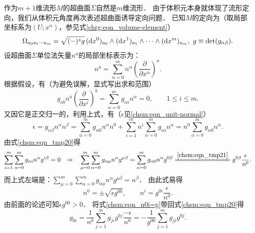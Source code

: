 作为$m+1$维流形$M$的超曲面$\Sigma$自然是$m$维流形．
由于体积元本身就体现了流形定向，我们从体积元角度再次表述超曲面诱导定向问题．
已知$M$的定向为（取局部坐标系为$(U;x^\alpha)$，参见式\eqref{chrg:eqn_volume-element}）
\begin{equation}\label{chsm:eqn_VEM}
    \Omega_{a_0 a_1 \cdots a_m}= \sqrt{(-)^s g}\, ({\rm d}x^0)_{a_0} \wedge({\rm d}x^1)_{a_1} \wedge
    \cdots \wedge({\rm d}x^m)_{a_m}, \  g\equiv \det(g_{\alpha\beta}).
\end{equation}
设超曲面$\Sigma$单位法矢量$n^a$的局部坐标表示为：
\begin{equation}
    n^a = \sum_{\alpha=0}^{m} n^\alpha \left(\frac{\partial }{\partial x^\alpha}\right)^a.
\end{equation}
根据假设，有（为避免误解，显式写出求和范围）
\begin{equation}\label{chsm:eqn_tmp20}
    g_{ab}n^a \left(\frac{\partial }{\partial x^i}\right)^b =
      \sum_{\alpha=0}^{m} g_{\alpha i}  n^\alpha =0, \qquad 1 \leqslant i \leqslant m.
\end{equation}
又因它是正交归一的，利用上式，有（$\epsilon$见\eqref{chsm:eqn_unit-normal}）
\begin{equation}\label{chsm:eqn_tmp21}
    \epsilon  = g_{\alpha\beta} n^\alpha n^\beta  %
     = \sum_{\alpha=0}^{m}g_{\alpha 0}n^\alpha n^0 + \sum_{i=1}^{m}  n^i \sum_{\alpha=0}^{m}g_{\alpha i}n^\alpha
     = n^0 \sum_{\alpha=0}^{m}g_{\alpha 0}n^\alpha  .
\end{equation}
由式\eqref{chsm:eqn_tmp20}得
\begin{equation*}
    \sum_{i=1}^{m}\sum_{\alpha=0}^{m} g_{\alpha i}  n^\alpha g^{i\beta} =0 {\quad \Rightarrow\quad }
    \sum_{\mu=0}^{m}\sum_{\alpha=0}^{m} g_{\alpha \mu}  n^\alpha g^{\mu\beta}
    =\sum_{\alpha=0}^{m} g_{\alpha 0}  n^\alpha g^{0\beta}
    \xlongequal{\ref{chsm:eqn_tmp21}}
    g^{0\beta} \frac{\epsilon}{n^0} .
\end{equation*}
而上式左端是：$\sum_{\mu=0}^{m}\sum_{\alpha=0}^{m} g_{\alpha \mu}  n^\alpha g^{\mu\beta} =n^\beta$．
由此式易得
\begin{equation}\label{chsm:eqn_n0i=g}
    n^0 = \pm \sqrt{\epsilon g^{00}}, \qquad
    n^i =  g^{0i} \frac{\epsilon}{n^0} .
\end{equation}
由前面的论述可知$\epsilon g^{00}>0$．
将式\eqref{chsm:eqn_n0i=g}带回式\eqref{chsm:eqn_tmp20}得
\begin{equation}
    g_{0i} = \frac{1}{n^0} \sum_{j=1}^{m} g_{ji} g^{0j} \frac{-\epsilon}{n^0}
      = -\frac{1}{g^{00}} \sum_{j=1}^{m} g_{ji} g^{0j} .
\end{equation}
